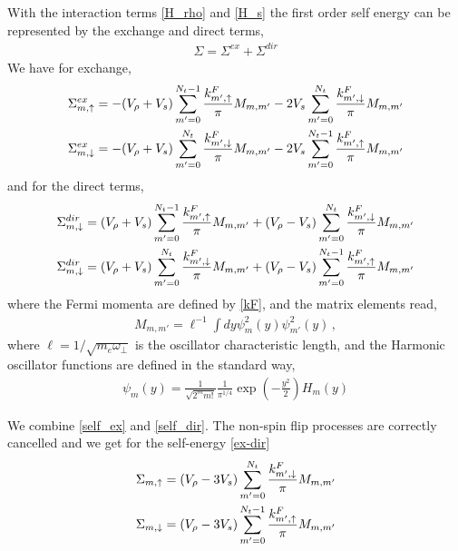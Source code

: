 With the interaction terms \eqref{H_rho} and \eqref{H_s} the first order self energy can be represented by the exchange and direct terms,
\begin{align}\label{ex-dir}
\Sigma = \Sigma^{ex} + \Sigma^{dir}
\end{align}
We have for exchange,
\begin{align}\label{self_ex}
\Sigma_{m,\uparrow}^{ex} & = - (V_{\rho} + V_s )\sum_{m'=0}^{N_t-1} \frac{k^F_{m',\uparrow}}{ \pi } M_{m,m'} 
- 2 V_s \sum_{m'=0}^{N_t} \frac{k^F_{m',\downarrow}}{ \pi } M_{m,m'} 
\notag \\
\Sigma_{m,\downarrow}^{ex} & = - (V_{\rho} + V_s )\sum_{m'=0}^{N_t} \frac{k^F_{m',\downarrow}}{ \pi } M_{m,m'}
- 2 V_s \sum_{m'=0}^{N_t-1} \frac{k^F_{m',\uparrow}}{ \pi } M_{m,m'} 
\end{align}
and for the direct terms,
\begin{align}\label{self_dir}
\Sigma_{m,\downarrow}^{dir} & =
(V_{\rho} + V_s) \sum_{m'=0}^{N_t-1} \frac{k^F_{m',\uparrow}}{ \pi } M_{m,m'} 
+
(V_{\rho} - V_s) \sum_{m'=0}^{N_t} \frac{k^F_{m',\downarrow}}{ \pi } M_{m,m'} 
 \notag \\
\Sigma_{m,\downarrow}^{dir} & = 
(V_{\rho} + V_s) \sum_{m'=0}^{N_t} \frac{k^F_{m',\downarrow}}{ \pi } M_{m,m'} 
+
(V_{\rho} - V_s) \sum_{m'=0}^{N_t-1} \frac{k^F_{m',\uparrow}}{ \pi } M_{m,m'} 
\end{align}
where the Fermi momenta are defined by \eqref{kF}, and the matrix elements read,
\begin{align}\label{M}
M_{m,m'} = \ell^{-1} \int d y \psi_m^2(y) \psi_{m'}^2(y)\, ,
\end{align}
where $\ell = 1/ \sqrt{m_e \omega_{\perp}}$ is the oscillator characteristic length, and the Harmonic oscillator functions are defined in the standard way,
\begin{align}\label{oscillator}
\psi_m(y) = \frac{ 1 }{ \sqrt{ 2^m m!} } \frac{ 1 }{ \pi^{1/4} }
\exp\left( - \frac{ y^2 }{ 2  } \right) H_m\left( y \right)
\end{align}



We combine \eqref{self_ex} and \eqref{self_dir}.
The non-spin flip processes are correctly cancelled and we get for the self-energy \eqref{ex-dir}
\begin{align}\label{self1_s_H1}
\Sigma_{m,\uparrow} & =
(V_{\rho}- 3 V_s) \sum_{m'=0}^{N_t} \frac{k^F_{m',\downarrow}}{ \pi } M_{m,m'} 
 \notag \\
\Sigma_{m,\downarrow} & = 
(V_{\rho}- 3 V_s) \sum_{m'=0}^{N_t-1} \frac{k^F_{m',\uparrow}}{ \pi } M_{m,m'} 
\end{align}
%
%
%
%
%

